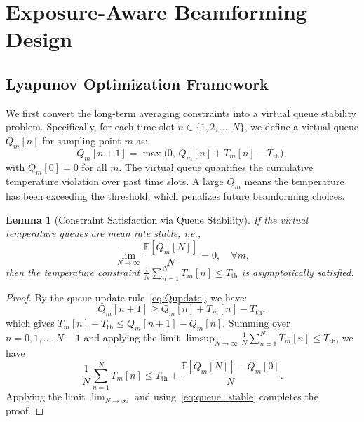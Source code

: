 \documentclass[journal]{IEEEtran}
\newtheorem{lemma}{Lemma}
\begin{document}
\section{Exposure-Aware Beamforming Design}
\label{sec:design}

\subsection{Lyapunov Optimization Framework}

We first convert the long-term averaging constraints into a virtual queue stability problem. Specifically, for each time slot $n \in \{1, 2, \ldots, N\}$, we define a virtual queue $Q_m[n]$ for sampling point $m$ as:
\begin{equation}
    Q_m[n+1] = \max\!\bigl(0,\, Q_m[n] + T_m[n] - T_{\text{th}}\bigr),
    \label{eq:Qupdate}
\end{equation}
with $Q_m[0] = 0$ for all $m$. The virtual queue quantifies the cumulative temperature violation over past time slots. A large $Q_m$ means the temperature has been exceeding the threshold, which penalizes future beamforming choices.

\begin{lemma}[Constraint Satisfaction via Queue Stability]
\label{lem:queue}
If the virtual temperature queues are mean rate stable, i.e.,
\begin{equation}
    \lim_{N\to\infty}\frac{\mathbb{E}[Q_m[N]]}{N} = 0, \quad \forall m,
    \label{eq:queue_stable}
\end{equation}
then the temperature constraint $\frac{1}{N}\sum_{n=1}^{N} T_m[n] \leq T_{\text{th}}$ is asymptotically satisfied.
\end{lemma}

\begin{proof}
By the queue update rule~\eqref{eq:Qupdate}, we have:
\begin{equation}
    Q_m[n+1] \geq Q_m[n] + T_m[n] - T_{\text{th}},
\end{equation}
which gives $T_m[n] - T_{\text{th}} \leq Q_m[n+1] - Q_m[n]$. Summing over $n = 0, 1, \ldots, N-1$ and applying the limit $\limsup_{N\to\infty} \frac{1}{N}\sum_{n=1}^{N}T_m[n] \leq T_{\text{th}}$, we have
\begin{equation}
    \frac{1}{N}\sum_{n=1}^{N} T_m[n] \leq T_{\text{th}} + \frac{\mathbb{E}[Q_m[N]] - Q_m[0]}{N}.
\end{equation}
Applying the limit $\lim_{N\to\infty}$ and using~\eqref{eq:queue_stable} completes the proof.
\end{proof}
\end{document}
